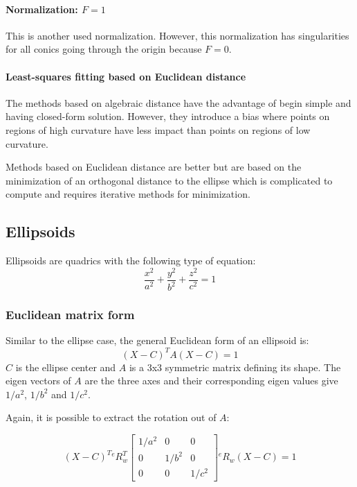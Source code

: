 \paragraph{Normalization: $F = 1$}
This is another used normalization. However, this normalization has singularities for all conics going through the origin because $F = 0$.


\paragraph{Least-squares fitting based on Euclidean distance}

The methods based on algebraic distance have the advantage of begin simple and having closed-form solution. However, they introduce a bias where points on regions of high curvature have less impact than points on regions of low curvature.

Methods based on Euclidean distance are better but are based on the minimization of an orthogonal distance to the ellipse which is complicated to compute and requires iterative methods for minimization.



\subsection{Ellipsoids}

Ellipsoids are quadrics with the following type of equation:
\begin{equation}
    \frac{x^2}{a^2} + \frac{y^2}{b^2} + \frac{z^2}{c^2} = 1
\end{equation}


\subsubsection{Euclidean matrix form}
Similar to the ellipse case, the general Euclidean form of an ellipsoid is:
\begin{equation}
    (X - C)^T A (X - C) = 1
\end{equation}
$C$ is the ellipse center and $A$ is a 3x3 symmetric matrix defining its shape. The eigen vectors of $A$ are the three axes and their corresponding eigen values give $1/a^2$, $1/b^2$ and $1/c^2$.

Again, it is possible to extract the rotation out of $A$:

\begin{equation}
(X - C)^T {}^{e}R_{w}^T \left[ \begin{array}{ccc}
    1/a^2 & 0 & 0 \\
    0 & 1/b^2 & 0 \\
    0 & 0 & 1/c^2
\end{array}
\right] {}^{e}R_{w} (X - C) = 1
\end{equation}


